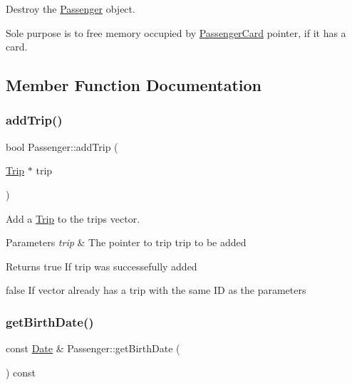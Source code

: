 Destroy the \mbox{\hyperlink{classPassenger}{Passenger}} object. 

Sole purpose is to free memory occupied by \mbox{\hyperlink{classPassengerCard}{Passenger\+Card}} pointer, if it has a card. 

\subsection{Member Function Documentation}
\mbox{\label{classPassenger_a2fef29e013c88ba7a75d259cebfa655d}} 
\subsubsection{\texorpdfstring{add\+Trip()}{addTrip()}}
{\footnotesize\ttfamily bool Passenger\+::add\+Trip (\begin{DoxyParamCaption}\item[{\mbox{\hyperlink{classTrip}{Trip}} $\ast$}]{trip }\end{DoxyParamCaption})}



Add a \mbox{\hyperlink{classTrip}{Trip}} to the trips vector. 


\begin{DoxyParams}{Parameters}
{\em trip} & The pointer to trip trip to be added \\
\hline
\end{DoxyParams}
\begin{DoxyReturn}{Returns}
true If trip was successefully added 

false If vector already has a trip with the same ID as the parameter\textquotesingle{}s 
\end{DoxyReturn}
\mbox{\label{classPassenger_aa2101584d2f0daf83ef58e0491754395}} 
\subsubsection{\texorpdfstring{get\+Birth\+Date()}{getBirthDate()}}
{\footnotesize\ttfamily const \mbox{\hyperlink{classDate}{Date}} \& Passenger\+::get\+Birth\+Date (\begin{DoxyParamCaption}{ }\end{DoxyParamCaption}) const}



